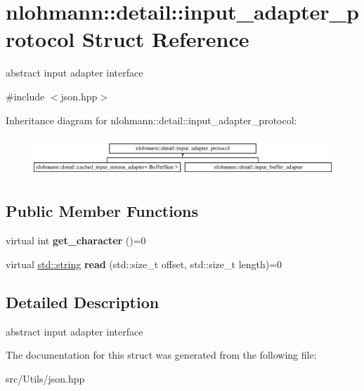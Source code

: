\hypertarget{structnlohmann_1_1detail_1_1input__adapter__protocol}{}\section{nlohmann\+:\+:detail\+:\+:input\+\_\+adapter\+\_\+protocol Struct Reference}
\label{structnlohmann_1_1detail_1_1input__adapter__protocol}


abstract input adapter interface  




{\ttfamily \#include $<$json.\+hpp$>$}

Inheritance diagram for nlohmann\+:\+:detail\+:\+:input\+\_\+adapter\+\_\+protocol\+:\begin{figure}[H]
\begin{center}
\leavevmode
\includegraphics[height=1.517615cm]{d8/d5f/structnlohmann_1_1detail_1_1input__adapter__protocol}
\end{center}
\end{figure}
\subsection*{Public Member Functions}
\begin{DoxyCompactItemize}
\item 
\mbox{\label{structnlohmann_1_1detail_1_1input__adapter__protocol_af4e0baade0a6b45a73d4e136875e7544}} 
virtual int {\bfseries get\+\_\+character} ()=0
\item 
\mbox{\label{structnlohmann_1_1detail_1_1input__adapter__protocol_a9ce6c8028229446d7014c0610fbd4599}} 
virtual \mbox{\hyperlink{namespacenlohmann_1_1detail_a90aa5ef615aa8305e9ea20d8a947980fab45cffe084dd3d20d928bee85e7b0f21}{std\+::string}} {\bfseries read} (std\+::size\+\_\+t offset, std\+::size\+\_\+t length)=0
\end{DoxyCompactItemize}


\subsection{Detailed Description}
abstract input adapter interface 

The documentation for this struct was generated from the following file\+:\begin{DoxyCompactItemize}
\item 
src/\+Utils/json.\+hpp\end{DoxyCompactItemize}
